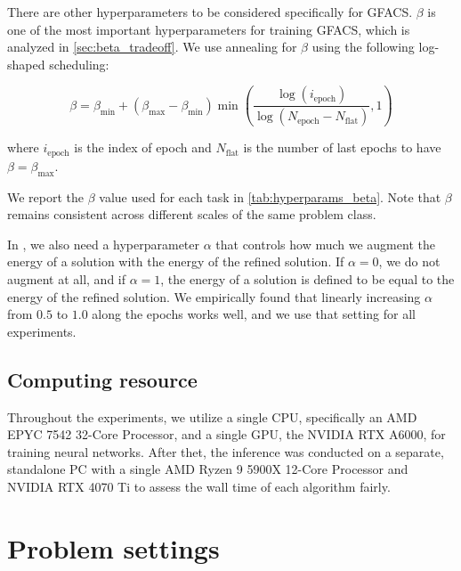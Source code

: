 \documentclass[twoside]{article}
\theoremstyle{plain}
\theoremstyle{definition}
\theoremstyle{remark}
\begin{document}
There are other hyperparameters to be considered specifically for GFACS. $\beta$ is one of the most important hyperparameters for training GFACS, which is analyzed in \cref{sec:beta_tradeoff}. We use annealing for $\beta$ using the following log-shaped scheduling:

\begin{equation*}
    \beta = \beta_{\text{min}} + (\beta_{\text{max}} - \beta_{\text{min}})\min\left(\frac{\log(i_{\text{epoch}})}{\log(N_{\text{epoch}} - N_{\text{flat}})}, 1\right)
\end{equation*}

where $i_{\text{epoch}}$ is the index of epoch and $N_{\text{flat}}$ is the number of last epochs to have $\beta = \beta_{\text{max}}$.

\begin{table}[ht]
    \centering
    \caption{Settings of $\beta$ for each task.}
    \resizebox{0.6\linewidth}{!}{}
    \label{tab:hyperparams_beta}
    \vspace{0pt}
\end{table}

We report the $\beta$ value used for each task in \cref{tab:hyperparams_beta}. Note that $\beta$ remains consistent across different scales of the same problem class.

In , we also need a hyperparameter $\alpha$ that controls how much we augment the energy of a solution with the energy of the refined solution. If $\alpha = 0$, we do not augment at all, and if $\alpha = 1$, the energy of a solution is defined to be equal to the energy of the refined solution. We empirically found that linearly increasing $\alpha$ from $0.5$ to $1.0$ along the epochs works well, and we use that setting for all experiments.


\subsection{Computing resource}\label{append:compute-resources}
Throughout the experiments, we utilize a single CPU, specifically an AMD EPYC 7542 32-Core Processor, and a single GPU, the NVIDIA RTX A6000, for training neural networks. After thet, the inference was conducted on a separate, standalone PC with a single AMD Ryzen 9 5900X 12-Core Processor and NVIDIA RTX 4070 Ti to assess the wall time of each algorithm fairly.




\section{Problem settings} \label{app:problems}
\end{document}
